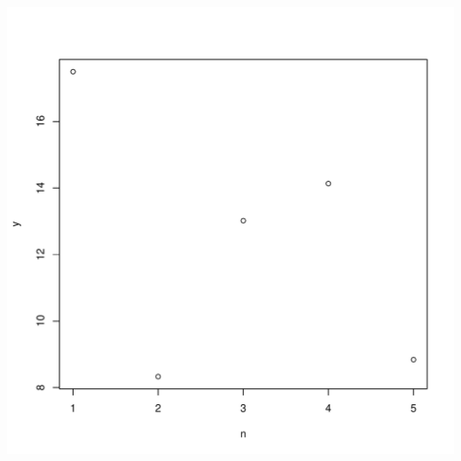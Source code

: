 \documentclass{article}\usepackage[]{graphicx}\usepackage[]{xcolor}
\makeatletter
\def\maxwidth{ %
  \ifdim\Gin@nat@width>\linewidth
    \linewidth
  \else
    \Gin@nat@width
  \fi
}
\newenvironment{knitrout}{}{} %
\makeatother
\begin{document}
\begin{knitrout}
\color{fgcolor}
\includegraphics[width=\maxwidth]{figure/Chunk02-1} 
\end{knitrout}
\end{document}
